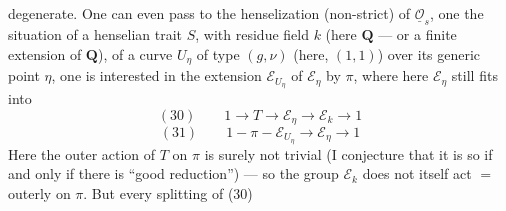 degenerate. One can even pass to the henselization (non-strict) of $\underline{\mathcal O}_s$, one  the situation of a henselian trait $S$, with residue field $k$ (here $\mathbf Q$ --- or a finite extension of $\mathbf Q$), of a curve $U_\eta$ of type $(g,\nu)$ (here, $(1,1)$) over its generic point $\eta$, one is interested in the extension $\mathcal E_{U_\eta}$ of $\mathcal E_\eta$ by $\pi$, where here $\mathcal E_\eta$ still fits into
\[
(30)\qquad 1\longrightarrow T\longrightarrow\mathcal E_\eta\longrightarrow\mathcal E_k\longrightarrow1
\]
 
\[
(31)\qquad 1-\pi-\mathcal E_{U_\eta}\longrightarrow\mathcal E_\eta\longrightarrow1
\]
Here the outer action of $T$ on $\pi$ is surely not trivial (I conjecture that it is so if and only if there is ``good reduction'') --- so the group $\mathcal E_k$ does not itself act $=$ outerly on $\pi$. But every splitting of (30)
